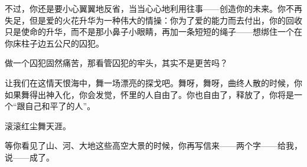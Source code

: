 \par 不过，你还是要小心翼翼地反省，当当心心地利用往事——创造你的未来。你不再失足，但是爱的火花升华为一种伟大的情操：你为了爱的能力而去付出，你的回收只是使命的升华，而不是那小鼻子小眼睛，再加一条短短的绳子——想绑住一个在你床柱子边五公尺的囚犯。
\par 做一个囚犯固然痛苦，那看管囚犯的牢头，其实不是更苦吗？
\par 让我们在这情天恨海中，舞一场漂亮的探戈吧。舞呀，舞呀，曲终人散的时候，你如果舞得出神入化，你会发觉，怀里的人自由了。你也自由了，释放了，你将是一个“跟自己和平了的人”。
\par 滚滚红尘舞天涯。
\par 等你看见了山、河、大地这些高空大景的时候，你再写信来——两个字——给我，说——成了。
\par {}

